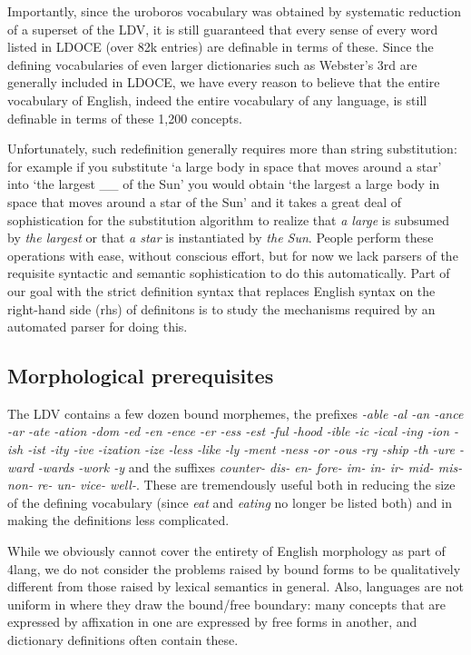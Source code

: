 \documentclass[11pt,bookmarks,bookmarksnumbered,naturalnames,plainpages=false,pdftex,colorlinks=true,urlcolor=blue,bookmarksdepth=subsection,plainpages=false]{paper}
\begin{document}
Importantly, since the uroboros vocabulary was obtained by systematic
reduction of a superset of the LDV, it is still guaranteed that every sense of
every word listed in LDOCE (over 82k entries) are definable in terms of
these. Since the defining vocabularies of even larger dictionaries such as
Webster's 3rd \citep{Merriam:1961} are generally included in LDOCE, we have
every reason to believe that the entire vocabulary of English, indeed the
entire vocabulary of any language, is still definable in terms of these 1,200
concepts. 

Unfortunately, such redefinition generally requires more than string
substitution: for example if you substitute `a large body in space that moves
around a star' into `the largest \_\_ of the Sun' you would obtain `the
largest a large body in space that moves around a star of the Sun' and it
takes a great deal of sophistication for the substitution algorithm to realize
that {\it a large} is subsumed by {\it the largest} or that {\it a star} is
instantiated by {\it the Sun}. People perform these operations with ease,
without conscious effort, but for now we lack parsers of the requisite
syntactic and semantic sophistication to do this automatically. Part of our
goal with the strict definition syntax that replaces English syntax on the
right-hand side (rhs) of definitons is to study the mechanisms required by an
automated parser for doing this. 

\subsection{Morphological prerequisites}\label{morphology}

The LDV contains a few dozen bound morphemes, the prefixes {\it -able -al -an
  -ance -ar -ate -ation -dom -ed -en -ence -er -ess -est -ful -hood -ible -ic
  -ical -ing -ion -ish -ist -ity -ive -ization -ize -less -like -ly -ment
  -ness -or -ous -ry -ship -th -ure -ward -wards -work -y} and the suffixes
{\it counter- dis- en- fore- im- in- ir- mid- mis- non- re- un- vice- well-}.
These are tremendously useful both in reducing the size of the defining
vocabulary (since {\it eat} and {\it eating} no longer be listed both) and in
making the definitions less complicated. 

While we obviously cannot cover the entirety of English morphology as part of
4lang, we do not consider the problems raised by bound forms to be
qualitatively different from those raised by lexical semantics in
general. Also, languages are not uniform in where they draw the bound/free
boundary: many concepts that are expressed by affixation in one are expressed
by free forms in another, and dictionary definitions often contain these.
\end{document}
